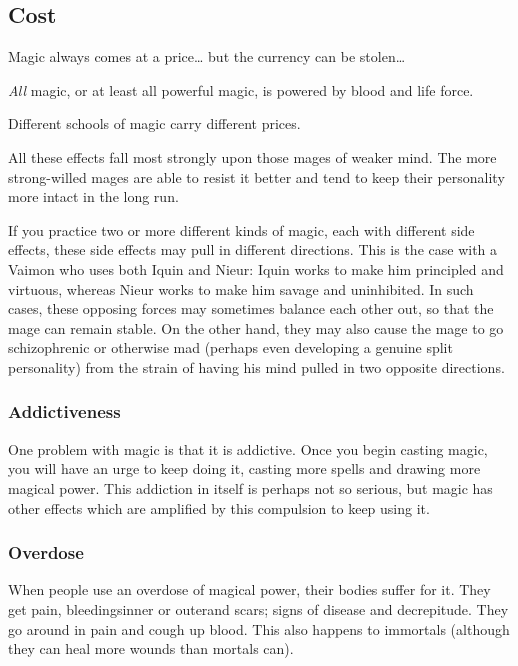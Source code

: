 \subsection{Cost}
Magic always comes at a price\ldots{} but the currency can be stolen\ldots{}

\emph{All} magic, or at least all powerful magic, is powered by blood and life force. 

Different schools of magic carry different prices.

All these effects fall most strongly upon those mages of weaker mind. The more strong-willed mages are able to resist it better and tend to keep their personality more intact in the long run. 

If you practice two or more different kinds of magic, each with different side effects, these side effects may pull in different directions. This is the case with a Vaimon who uses both Iquin and Nieur: Iquin works to make him principled and virtuous, whereas Nieur works to make him savage and uninhibited. In such cases, these opposing forces may sometimes balance each other out, so that the mage can remain stable. On the other hand, they may also cause the mage to go schizophrenic or otherwise mad (perhaps even developing a genuine split personality) from the strain of having his mind pulled in two opposite directions. 






\subsubsection{Addictiveness}
One problem with magic is that it is addictive. Once you begin casting magic, you will have an urge to keep doing it, casting more spells and drawing more magical power. This addiction in itself is perhaps not so serious, but magic has other effects which are amplified by this compulsion to keep using it. 





\subsubsection{Overdose}
When people use an overdose of magical power, their bodies suffer for it.
They get pain, bleedings\dash{}inner or outer\dash{}and scars; signs of disease and decrepitude.
They go around in pain and cough up blood.
This also happens to immortals (although they can heal more wounds than mortals can).

